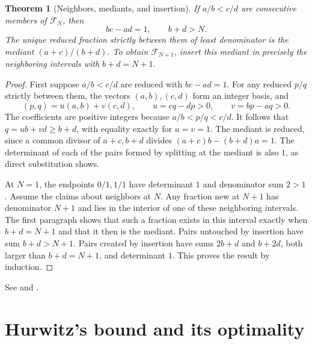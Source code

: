 \documentclass[11pt,oneside,openany]{book}
\theoremstyle{plain}
\newtheorem{theorem}{Theorem}[chapter]
\theoremstyle{definition}
\theoremstyle{remark}
\begin{document}
\begin{theorem}[Neighbors, mediants, and insertion]
If \(a/b<c/d\) are consecutive members of \(\mathcal F_N\), then
\[
 bc-ad=1,\qquad b+d>N.
\]
The unique reduced fraction strictly between them of least denominator
is the mediant \((a+c)/(b+d)\). To obtain \(\mathcal F_{N+1}\), insert
this mediant in precisely the neighboring intervals with \(b+d=N+1\).
\end{theorem}
\begin{proof}
First suppose \(a/b<c/d\) are reduced with \(bc-ad=1\). For any reduced
\(p/q\) strictly between them, the vectors \((a,b),(c,d)\) form an
integer basis, and
\[
 (p,q)=u(a,b)+v(c,d),\qquad
 u=cq-dp>0,\qquad v=bp-aq>0.
\]
The coefficients are positive integers because \(a/b<p/q<c/d\).
It follows that \(q=ub+vd\ge b+d\), with equality exactly for
\(u=v=1\). The mediant is reduced, since a common divisor of
\(a+c,b+d\) divides \((a+c)b-(b+d)a=1\). The determinant of each of
the pairs formed by splitting at the mediant is also \(1\), as direct
substitution shows.

At \(N=1\), the endpoints \(0/1,1/1\) have determinant \(1\) and
denominator sum \(2>1\). Assume the claims about neighbors at \(N\).
Any fraction new at \(N+1\) has denominator \(N+1\) and lies in the
interior of one of these neighboring intervals. The first paragraph
shows that such a fraction exists in this interval exactly when
\(b+d=N+1\) and that it then is the mediant. Pairs untouched by
insertion have sum \(b+d>N+1\). Pairs created by insertion have sums
\(2b+d\) and \(b+2d\), both larger than \(b+d=N+1\), and determinant
\(1\). This proves the result by induction.
\end{proof}

See \cite[Chapter III]{hardy-wright} and
\cite[\S\S6.1--6.2, Theorems 6.1, 6.4, and 6.7]{nzm}.

\section{Hurwitz's bound and its optimality}
\label{nt:E07}
\end{document}
